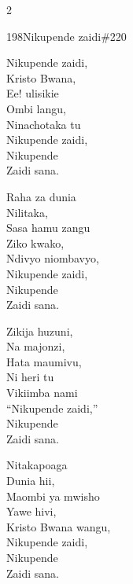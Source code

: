 \begin{multicols}{2}
\begin{hymn}{198}{Nikupende zaidi}{\#220}
\begin{stanza}
Nikupende zaidi,\\
Kristo Bwana,\\
Ee! ulisikie\\
Ombi langu,\\
Ninachotaka tu\\
Nikupende zaidi,\\
Nikupende\\
Zaidi sana.
\end{stanza}
\begin{stanza}
Raha za dunia\\
Nilitaka,\\
Sasa hamu zangu\\
Ziko kwako,\\
Ndivyo niombavyo,\\
Nikupende zaidi,\\
Nikupende\\
Zaidi sana.
\end{stanza}
\begin{stanza}
Zikija huzuni,\\
Na majonzi,\\
Hata maumivu,\\
Ni heri tu\\
Vikiimba nami\\
``Nikupende zaidi,''\\
Nikupende\\
Zaidi sana.
\end{stanza}
\begin{stanza}
Nitakapoaga\\
Dunia hii,\\
Maombi ya mwisho\\
Yawe hivi,\\
Kristo Bwana wangu,\\
Nikupende zaidi,\\
Nikupende\\
Zaidi sana.
\end{stanza}
\end{hymn}


\end{multicols}
